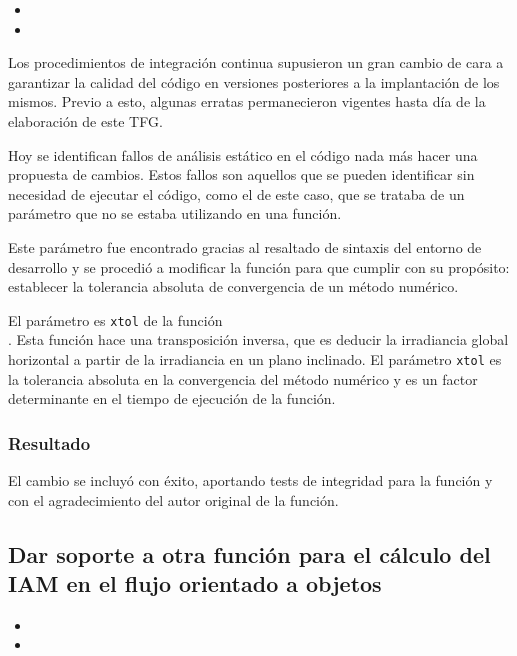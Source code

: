 \begin{itemize}
    \item {}
    \item {}
\end{itemize}

Los procedimientos de integración continua supusieron un gran cambio de cara a garantizar la calidad del código en versiones posteriores a la implantación de los mismos. Previo a esto, algunas erratas permanecieron vigentes hasta día de la elaboración de este TFG.

Hoy se identifican fallos de análisis estático en el código nada más hacer una propuesta de cambios. Estos fallos son aquellos que se pueden identificar sin necesidad de ejecutar el código, como el de este caso, que se trataba de un \gls{parámetro} que no se estaba utilizando en una función.

Este parámetro fue encontrado gracias al resaltado de sintaxis del \gls{entorno de desarrollo} y se procedió a modificar la función para que cumplir con su propósito: establecer la tolerancia absoluta de convergencia de un método numérico.

El parámetro es \texttt{xtol} de la función\\ . Esta función hace una \gls{transposición inversa}, que es deducir la irradiancia global horizontal a partir de la irradiancia en un plano inclinado. El parámetro \texttt{xtol} es la tolerancia absoluta en la convergencia del método numérico y es un factor determinante en el tiempo de ejecución de la función.

\subsubsection{Resultado}

El cambio se incluyó con éxito, aportando tests de integridad para la función y con el agradecimiento del autor original de la función.

\subsection{Dar soporte a otra función para el cálculo del IAM en el flujo orientado a objetos}

\begin{itemize}
    \item {}
    \item {}
\end{itemize}

